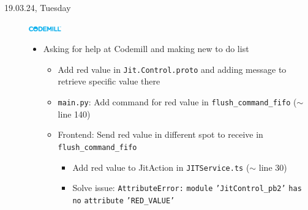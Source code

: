 \documentclass[a4, 11pt]{scrartcl}
\newcommand{\cmark}{\ding{51}}%
\newcommand{\done}{\rlap{$\square$}{\raisebox{2pt}{\large\hspace{1pt}\cmark}}%
	\hspace{-2.5pt}}
\begin{document}
\begin{description}
	
	
	
	\item[19.03.24, Tuesday]
	\includegraphics[width=1.4cm]{codemill.png}
	\begin{itemize}
		\item Asking for help at Codemill and making new to do list
		\begin{itemize}
			
			\item[\done] Add red value in \texttt{Jit.Control.proto} and adding message to retrieve specific value there
			
			\item[\done] \texttt{main.py}: Add command for red value in \texttt{flush\_command\_fifo} ($\sim$ line 140)
			
			\item[\done] Frontend: Send red value in different spot to receive in \texttt{flush\_command\_fifo}
			
			\begin{itemize}
				\item[\done] Add red value to JitAction in \texttt{JITService.ts} ($\sim$ line 30)
				
				\item[\done] Solve issue: \texttt{AttributeError:} \texttt{module} \texttt{'JitControl\_pb2'} \texttt{has} \texttt{no} \texttt{attribute} \texttt{'RED\_VALUE'}
				

\end{itemize}
\end{itemize}
\end{itemize}
\end{description}
\end{document}
